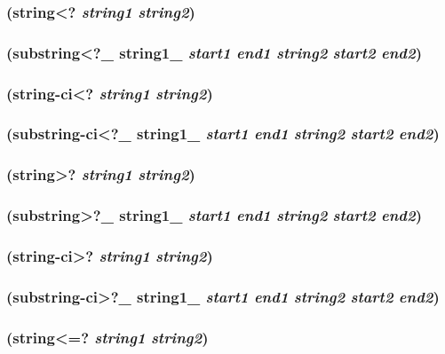 \documentclass{article}
\begin{document}
\subsubsection{(string\textless{}? \emph{string1} \emph{string2})}

\subsubsection{(substring\textless{}?\_ string1\_ \emph{start1} \emph{end1} \emph{string2} \emph{start2} \emph{end2})}

\subsubsection{(string-ci\textless{}? \emph{string1} \emph{string2})}

\subsubsection{(substring-ci\textless{}?\_ string1\_ \emph{start1} \emph{end1} \emph{string2} \emph{start2} \emph{end2})}

\subsubsection{(string\textgreater{}? \emph{string1} \emph{string2})}

\subsubsection{(substring\textgreater{}?\_ string1\_ \emph{start1} \emph{end1} \emph{string2} \emph{start2} \emph{end2})}

\subsubsection{(string-ci\textgreater{}? \emph{string1} \emph{string2})}

\subsubsection{(substring-ci\textgreater{}?\_ string1\_ \emph{start1} \emph{end1} \emph{string2} \emph{start2} \emph{end2})}

\subsubsection{(string\textless{}=? \emph{string1} \emph{string2})}
\end{document}
